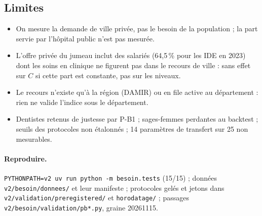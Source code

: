 \subsection{Limites}\label{bes:limites}
\begin{itemize}
  \item On mesure la demande de ville privée, pas le besoin de la population ; la part servie par l'hôpital public
        n'est pas mesurée.
  \item L'offre privée du jumeau inclut des salariés (64,5\,\% pour les IDE en 2023\mesure{}) dont les soins en clinique
        ne figurent pas dans le recours de ville : sans effet sur $C$ si cette part est constante, pas sur les
        niveaux.
  \item Le recours n'existe qu'à la région (DAMIR) ou en file active au département : rien ne valide l'indice sous le
        département.
  \item Dentistes retenus de justesse par P-B1 ; sages-femmes perdantes au backtest ; seuils des protocoles non
        étalonnés ; 14 paramètres de transfert sur 25 non mesurables.
\end{itemize}

\paragraph{Reproduire.} \texttt{PYTHONPATH=v2 uv run python -m besoin.tests} (15/15\mesure{}) ; données
\texttt{v2/besoin/donnees/} et leur manifeste ; protocoles gelés et jetons dans \texttt{v2/validation/preregistered/}
et \texttt{horodatage/} ; passages \texttt{v2/besoin/validation/pb*.py}, graine 20261115.

\endgroup
